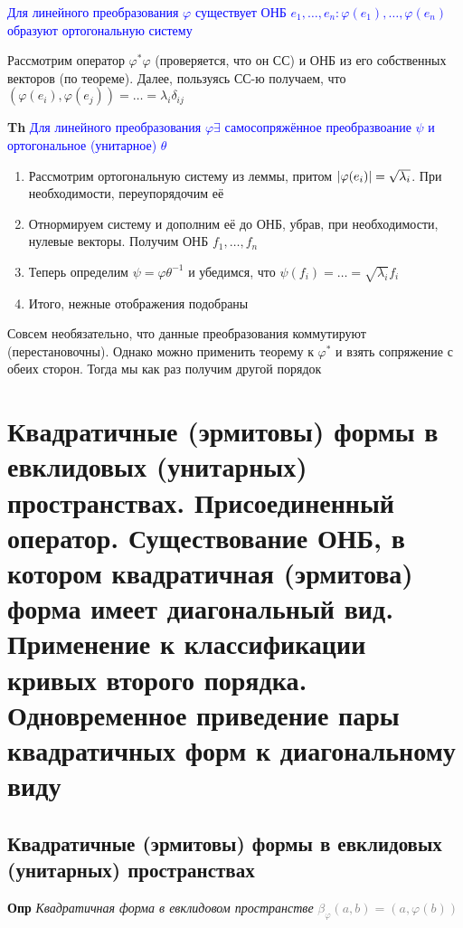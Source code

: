 \documentclass[a4paper, 14pt]{article}
\begin{document}
    \textcolor{blue}{Для линейного преобразования $\varphi$ существует
    ОНБ $e_1, \dots, e_n: \varphi(e_1), \dots, \varphi(e_n)$ образуют ортогональную систему}
    
    Рассмотрим оператор $\varphi^* \varphi$ (проверяется, что он СС) и ОНБ из его собственных векторов (по теореме).
    Далее, пользуясь СС-ю получаем, что $(\varphi(e_i), \varphi(e_j)) = \dots = \lambda_i \delta_{ij}$
    
    \textbf{Th} \textcolor{blue}{Для линейного преобразования $\varphi \exists$ самосопряжённое
    преобразвоание $\psi$ и ортогональное (унитарное) $\theta$}
    
    \begin{enumerate}
        \item Рассмотрим ортогональную систему из леммы, притом $\abs{\varphi(e_i)} = \sqrt{\lambda_i}$.
        При необходимости, переупорядочим её
        \item Отнормируем систему и дополним её до ОНБ, убрав, при необходимости, нулевые векторы.
        Получим ОНБ $f_1, \dots, f_n$
        \item Теперь определим $\psi = \varphi \theta^{-1}$ и убедимся, что $\psi(f_i) = \dots = \sqrt{\lambda_i} f_i$
        \item Итого, нежные отображения подобраны
    \end{enumerate}
    
    Совсем необязательно, что данные преобразования коммутируют (перестановочны).
    Однако можно применить теорему к $\varphi^*$ и взять сопряжение с обеих сторон.
    Тогда мы как раз получим другой порядок
    
    \section{Квадратичные (эрмитовы) формы в евклидовых (унитарных) пространствах.
    Присоединенный оператор.
    Существование ОНБ, в котором квадратичная (эрмитова) форма имеет диагональный вид.
    Применение к классификации кривых второго порядка.
    Одновременное приведение пары квадратичных форм к диагональному виду}
    
    \subsection{Квадратичные (эрмитовы) формы в евклидовых (унитарных) пространствах}
    
    \textbf{Опр} \textit{Квадратичная форма в евклидовом пространстве} \textcolor{gray}{$\beta_\varphi (a, b) = (a, \varphi(b))$}
    
\end{document}
